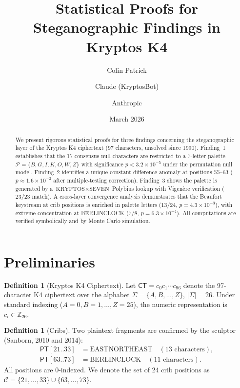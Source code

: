 \documentclass[11pt]{article}
\title{Statistical Proofs for Steganographic Findings in Kryptos K4}
\author{Colin Patrick \and Claude (KryptosBot) \and Anthropic}
\date{March 2026}
\theoremstyle{plain}
\theoremstyle{definition}
\newtheorem{definition}[theorem]{Definition}
\theoremstyle{remark}
\newcommand{\CT}{\mathsf{CT}}
\newcommand{\PT}{\mathsf{PT}}
\newcommand{\palette}{\mathcal{P}}
\begin{document}
\maketitle

\begin{abstract}
We present rigorous statistical proofs for three findings concerning the steganographic layer of the Kryptos K4 ciphertext (97 characters, unsolved since 1990). Finding~1 establishes that the 17 consensus null characters are restricted to a 7-letter palette $\palette = \{B,G,I,K,O,W,Z\}$ with significance $p < 3.2 \times 10^{-5}$ under the permutation null model. Finding~2 identifies a unique constant-difference anomaly at positions 55--63 ($p \approx 1.6 \times 10^{-3}$ after multiple-testing correction). Finding~3 shows the palette is generated by a $\text{KRYPTOS} \times \text{SEVEN}$ Polybius lookup with Vigen\`{e}re verification ($23/23$ match). A cross-layer convergence analysis demonstrates that the Beaufort keystream at crib positions is enriched in palette letters ($13/24$, $p = 4.3 \times 10^{-3}$), with extreme concentration at BERLINCLOCK ($7/8$, $p = 6.3 \times 10^{-4}$). All computations are verified symbolically and by Monte Carlo simulation.
\end{abstract}

\section{Preliminaries}

\begin{definition}[Kryptos K4 Ciphertext]
Let $\CT = c_0 c_1 \cdots c_{96}$ denote the 97-character K4 ciphertext over the alphabet $\Sigma = \{A, B, \ldots, Z\}$, $\lvert\Sigma\rvert = 26$. Under standard indexing ($A=0, B=1, \ldots, Z=25$), the numeric representation is $c_i \in \mathbb{Z}_{26}$.
\end{definition}

\begin{definition}[Cribs]
Two plaintext fragments are confirmed by the sculptor (Sanborn, 2010 and 2014):
\begin{align}
\PT[21..33] &= \text{EASTNORTHEAST} \quad (13 \text{ characters}), \label{eq:crib-ene} \\
\PT[63..73] &= \text{BERLINCLOCK} \quad (11 \text{ characters}). \label{eq:crib-bcl}
\end{align}
All positions are 0-indexed. We denote the set of 24 crib positions as $\mathcal{C} = \{21,\ldots,33\} \cup \{63,\ldots,73\}$.
\end{definition}
\end{document}
